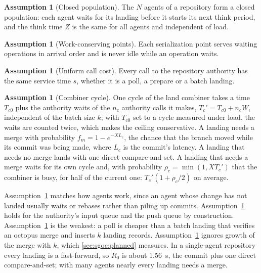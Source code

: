 \documentclass[11pt,letterpaper]{article}
\theoremstyle{definition}
\newtheorem{assumption}[theorem]{Assumption}
\theoremstyle{remark}
\begin{document}
\begin{assumption}[Closed population]
\label{ass:sgoc:closed}
The $N$ agents of a repository form a closed population: each agent waits for its landing before it starts its next think period, and the think time $Z$ is the same for all agents and independent of load.
\end{assumption}

\begin{assumption}[Work-conserving points]
\label{ass:sgoc:fifo}
Each serialization point serves waiting operations in arrival order and is never idle while an operation waits.
\end{assumption}

\begin{assumption}[Uniform call cost]
\label{ass:sgoc:uniform}
Every call to the repository authority has the same service time $s$, whether it is a poll, a prepare or a batch landing.
\end{assumption}

\begin{assumption}[Combiner cycle]
\label{ass:sgoc:combiner}
One cycle of the land combiner takes a time $T_{c0}$ plus the authority waits of the $n_c$ authority calls it makes, $T_c' = T_{c0} + n_c W$, independent of the batch size $k$; with $T_{c0}$ set to a cycle measured under load, the waits are counted twice, which makes the ceiling conservative. A landing needs a merge with probability $f_m = 1 - e^{-X L_c}$, the chance that the branch moved while its commit was being made, where $L_c$ is the commit's latency. A landing that needs no merge lands with one direct compare-and-set. A landing that needs a merge waits for its own cycle and, with probability $\rho_c = \min(1, X T_c')$ that the combiner is busy, for half of the current one: $T_c'(1 + \rho_c/2)$ on average.
\end{assumption}

Assumption~\ref{ass:sgoc:closed} matches how agents work, since an agent whose change has not landed usually waits or rebases rather than piling up commits. Assumption~\ref{ass:sgoc:fifo} holds for the authority's input queue and the push queue by construction. Assumption~\ref{ass:sgoc:uniform} is the weakest: a poll is cheaper than a batch landing that verifies an octopus merge and inserts $k$ landing records. Assumption~\ref{ass:sgoc:combiner} ignores growth of the merge with $k$, which \cref{sec:sgoc:planned} measures. In a single-agent repository every landing is a fast-forward, so $R_0$ is about 1.56~s, the commit plus one direct compare-and-set; with many agents nearly every landing needs a merge. %
\end{document}
